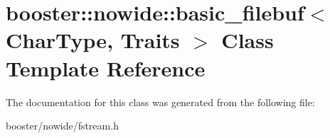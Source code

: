 \section{booster\+:\+:nowide\+:\+:basic\+\_\+filebuf$<$ Char\+Type, Traits $>$ Class Template Reference}
\label{classbooster_1_1nowide_1_1basic__filebuf}


The documentation for this class was generated from the following file\+:\begin{DoxyCompactItemize}
\item 
booster/nowide/fstream.\+h\end{DoxyCompactItemize}
